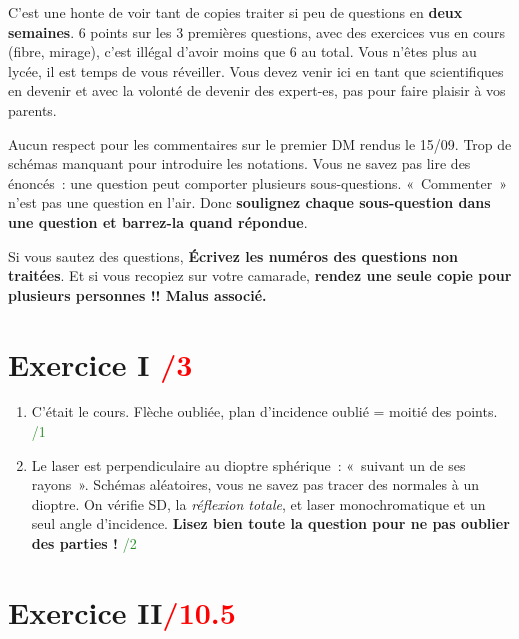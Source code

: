 \documentclass[a4paper, 10pt, final, garamond]{book}
\begin{document}
C'est une honte de voir tant de copies traiter si peu de questions en
\textbf{deux semaines}. 6 points sur les 3 premières questions, avec des
exercices vus en cours (fibre, mirage), c'est illégal d'avoir moins que 6 au
total. Vous n'êtes plus au lycée, il est temps de vous réveiller. Vous devez
venir ici en tant que scientifiques en devenir et avec la volonté de devenir des
expert-es, pas pour faire plaisir à vos parents.

Aucun respect pour les commentaires sur le premier DM rendus le 15/09. Trop de
schémas manquant pour introduire les notations. Vous ne savez pas lire des
énoncés~: une question peut comporter plusieurs sous-questions. «~Commenter~»
n'est pas une question en l'air. Donc \textbf{soulignez chaque sous-question
dans une question et barrez-la quand répondue}.

Si vous sautez des questions, \textbf{Écrivez les numéros des questions non
traitées}. Et si vous recopiez sur votre camarade, \textbf{rendez une seule
copie pour plusieurs personnes !! Malus associé.}

\section{Exercice I \hfill \textcolor{red}{/3}}

\begin{enumerate}
    \item{C'était le cours. Flèche oubliée, plan d'incidence oublié = moitié des
        points. \hfill \textcolor{ForestGreen}{/1}}

    \item{Le laser est perpendiculaire au dioptre sphérique~: «~suivant un de
            ses rayons~». Schémas aléatoires, vous ne savez pas tracer des
            normales à un dioptre. On vérifie SD, la \textit{réflexion totale},
            et laser monochromatique et un seul angle d'incidence. \textbf{Lisez
            bien toute la question pour ne pas oublier des parties !}\hfill
        \textcolor{ForestGreen}{/2}}
\end{enumerate}

\section{Exercice II\hfill \textcolor{red}{/\num{10.5}}}
\end{document}
